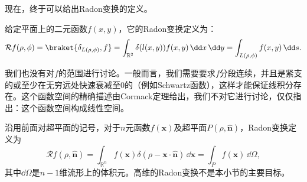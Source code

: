 现在，终于可以给出Radon变换的定义。
\begin{definition}[Radon变换]
    给定平面上的二元函数$f(x,y)$，它的Radon变换定义为：
    \begin{equation}
        \mathcal{R}f(\rho,\phi)=\braket{\delta_{L(\rho,\phi)},f}=\int_{\mathbb{R}^2}\delta(l(x,y))f(x,y)\,\dd x\,\dd y=\int_{L(\rho,\phi)}f(x,y)\,\dd s.
    \end{equation}
\end{definition}
\begin{remark}
    我们也没有对$f$的范围进行讨论。一般而言，我们需要要求$f$分段连续，并且是紧支的或至少在无穷远处快速衰减至$0$的（例如Schwartz函数），这样才能保证线积分存在。这个函数空间的精确描述由Cormack定理给出，我们不对它进行讨论，仅仅指出：这个函数空间构成线性空间。
\end{remark}
\begin{remark}
    沿用前面对超平面的记号，对于$n$元函数$f(\mathbf{x})$及超平面$P(\rho,\hat{\mathbf{n}})$，Radon变换定义为
    \begin{equation}
        \mathcal{R}f(\rho,\hat{\mathbf{n}})=\int_{\mathbb{R}^n}f(\mathbf{x})\delta(\rho-\mathbf{x}\cdot\hat{\mathbf{n}})\,\dd\mathbf{x}=\int_{P}f(\mathbf{x})\,\dd\Omega,
    \end{equation}
    其中$\dd\Omega$是$n-1$维流形上的体积元。高维的Radon变换不是本小节的主要目标。
\end{remark}

